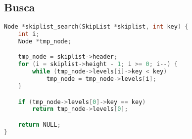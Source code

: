 \documentclass[paper=a4, fontsize=11pt]{scrartcl} %
\numberwithin{equation}{section}
\numberwithin{figure}{section}
\numberwithin{table}{section}
\numberwithin{definition}{section}
\numberwithin{theorem}{section}
\numberwithin{property}{section}
\numberwithin{proposition}{section}
\begin{document}
\subsection{Busca}

\begin{lstlisting}[caption=Busca., language=C]
Node *skiplist_search(SkipList *skiplist, int key) {
    int i;
    Node *tmp_node;

    tmp_node = skiplist->header;
    for (i = skiplist->height - 1; i >= 0; i--) {
        while (tmp_node->levels[i]->key < key)
            tmp_node = tmp_node->levels[i];
    }

    if (tmp_node->levels[0]->key == key)
        return tmp_node->levels[0];

    return NULL;
}
\end{lstlisting}
\end{document}
